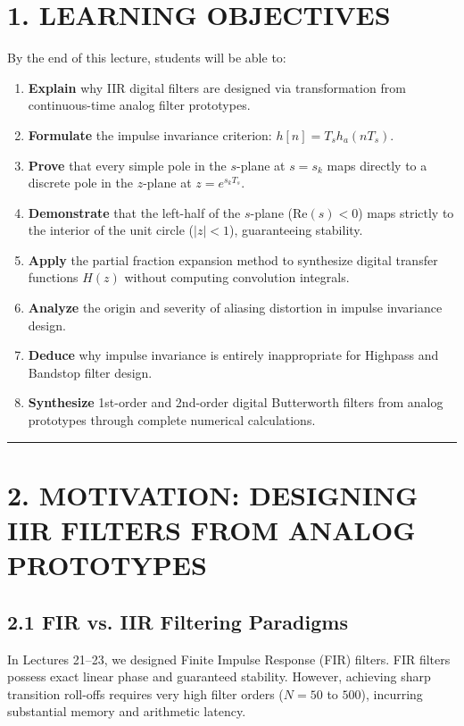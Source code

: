 \documentclass[11pt,a4paper]{article}
\begin{document}
\section{1. LEARNING OBJECTIVES}
By the end of this lecture, students will be able to:
\begin{enumerate}
    \item \textbf{Explain} why IIR digital filters are designed via transformation from continuous-time analog filter prototypes.
    \item \textbf{Formulate} the impulse invariance criterion: $h[n] = T_s h_a(n T_s)$.
    \item \textbf{Prove} that every simple pole in the $s$-plane at $s = s_k$ maps directly to a discrete pole in the $z$-plane at $z = e^{s_k T_s}$.
    \item \textbf{Demonstrate} that the left-half of the $s$-plane ($\text{Re}(s) < 0$) maps strictly to the interior of the unit circle ($|z| < 1$), guaranteeing stability.
    \item \textbf{Apply} the partial fraction expansion method to synthesize digital transfer functions $H(z)$ without computing convolution integrals.
    \item \textbf{Analyze} the origin and severity of aliasing distortion in impulse invariance design.
    \item \textbf{Deduce} why impulse invariance is entirely inappropriate for Highpass and Bandstop filter design.
    \item \textbf{Synthesize} 1st-order and 2nd-order digital Butterworth filters from analog prototypes through complete numerical calculations.
\end{enumerate}

\noindent\rule{\textwidth}{0.5pt}

\section{2. MOTIVATION: DESIGNING IIR FILTERS FROM ANALOG PROTOTYPES}

\subsection{2.1 FIR vs. IIR Filtering Paradigms}
In Lectures 21--23, we designed Finite Impulse Response (FIR) filters. FIR filters possess exact linear phase and guaranteed stability. However, achieving sharp transition roll-offs requires very high filter orders ($N = 50$ to $500$), incurring substantial memory and arithmetic latency.
\end{document}
